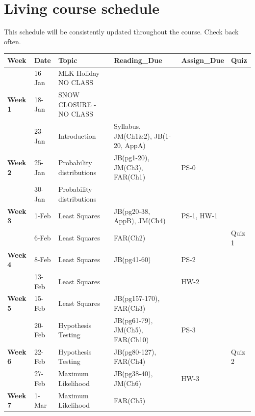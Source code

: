 \documentclass[
  letterpaper,
  DIV=11,
  numbers=noendperiod]{scrreprt}
\begin{document}
\hypertarget{sec-schedule}{%
\section{Living course schedule}\label{sec-schedule}}

This schedule will be consistently updated throughout the course. Check
back often.

\begin{table}
\centering
\begin{tabular}[t]{>{}l|l|l|l|l|l}
\hline
Week & Date & Topic & Reading\_Due & Assign\_Due & Quiz\\
\hline
 & 16-Jan & MLK Holiday - NO CLASS &  &  & \\
\cline{2-6}
\multirow{-2}{*}{\raggedright\arraybackslash \textbf{Week 1}} & 18-Jan & SNOW CLOSURE - NO CLASS &  &  & \\
\cline{1-6}
 & 23-Jan & Introduction & Syllabus, JM(Ch1\&2), JB(1-20, AppA) &  & \\
\cline{2-6}
\multirow{-2}{*}{\raggedright\arraybackslash \textbf{Week 2}} & 25-Jan & Probability distributions & JB(pg1-20), JM(Ch3), FAR(Ch1) & PS-0 & \\
\cline{1-6}
 & 30-Jan & Probability distributions &  &  & \\
\cline{2-6}
\multirow{-2}{*}{\raggedright\arraybackslash \textbf{Week 3}} & 1-Feb & Least Squares & JB(pg20-38, AppB), JM(Ch4) & PS-1, HW-1 & \\
\cline{1-6}
 & 6-Feb & Least Squares & FAR(Ch2) &  & Quiz 1\\
\cline{2-6}
\multirow{-2}{*}{\raggedright\arraybackslash \textbf{Week 4}} & 8-Feb & Least Squares & JB(pg41-60) & PS-2 & \\
\cline{1-6}
 & 13-Feb & Least Squares &  & HW-2 & \\
\cline{2-6}
\multirow{-2}{*}{\raggedright\arraybackslash \textbf{Week 5}} & 15-Feb & Least Squares & JB(pg157-170), FAR(Ch3) &  & \\
\cline{1-6}
 & 20-Feb & Hypothesis Testing & JB(pg61-79), JM(Ch5), FAR(Ch10) & PS-3 & \\
\cline{2-6}
\multirow{-2}{*}{\raggedright\arraybackslash \textbf{Week 6}} & 22-Feb & Hypothesis Testing & JB(pg80-127), FAR(Ch4) &  & Quiz 2\\
\cline{1-6}
 & 27-Feb & Maximum Likelihood & JB(pg38-40), JM(Ch6) & HW-3 & \\
\cline{2-6}
\multirow{-2}{*}{\raggedright\arraybackslash \textbf{Week 7}} & 1-Mar & Maximum Likelihood & FAR(Ch5) &  & \\

\end{tabular}
\end{table}
\end{document}

